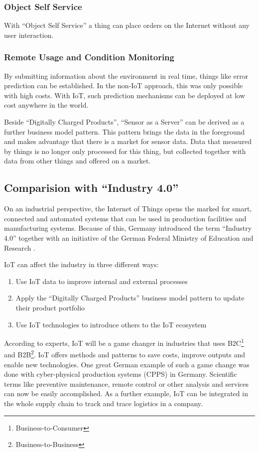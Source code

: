 \subsubsection{Object Self Service}
With ``Object Self Service'' a thing can place orders on the Internet without any user interaction.

\subsubsection{Remote Usage and Condition Monitoring}
By submitting information about the environment in real time, things like error prediction can be established. In the non-IoT approach, this was only possible with high costs. With IoT, such prediction mechanisms can be deployed at low cost anywhere in the world.

Beside ``Digitally Charged Products'', ``Sensor as a Server'' can be derived as a further business model pattern. This pattern brings the data in the foreground and makes advantage that there is a market for sensor data. Data that measured by things is no longer only processed for this thing, but collected together with data from other things and offered on a market.

\subsection{Comparision with ``Industry 4.0''}
On an industrial perspective, the Internet of Things opens the marked for smart, connected and automated systems that can be used in production facilities and manufacturing systems. Because of this, Germany introduced the term ``Industry 4.0'' together with an initiative of the German Federal Ministry of Education and Research \cite{iotfleisch2}.

IoT can affect the industry in three different ways: \cite{iotfleisch2}
\begin{enumerate}
	\item Use IoT data to improve internal and external processes
	\item Apply the ``Digitally Charged Products'' business model pattern to update their product portfolio
	\item Use IoT technologies to introduce others to the IoT ecosystem
\end{enumerate}

According to experts, IoT will be a game changer in industries that uses B2C\footnote{Business-to-Consumer} and B2B\footnote{Business-to-Business}. IoT offers methods and patterns to save costs, improve outputs and enable new technologies. One great German example of such a game change was done with cyber-physical production systems (CPPS) in Germany. Scientific terms like preventive maintenance, remote control or other analysis and services can now be easily accomplished. As a further example, IoT can be integrated in the whole supply chain to track and trace logistics in a company. \cite{iotfleisch2}

